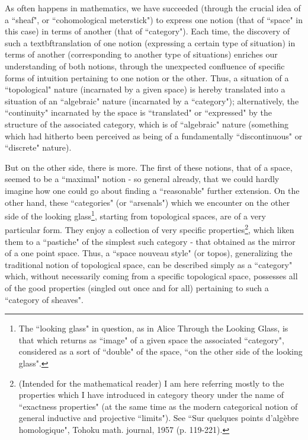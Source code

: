 As often happens in mathematics, we have succeeded (through the crucial idea of a ``sheaf", or ``cohomological meterstick") to express one notion (that of ``space" in this case) in terms of another (that of ``category"). Each time, the discovery of such a textbf{translation} of one notion (expressing a certain type of situation) in terms of another (corresponding to another type of situations) enriches our understanding of both notions, through the unexpected confluence of specific forms of intuition pertaining to one notion or the other. Thus, a situation of a ``topological" nature (incarnated by a given space) is hereby translated into a situation of an ``algebraic" nature (incarnated by a ``category"); alternatively, the ``continuity" incarnated by the space is ``translated" or ``expressed" by the structure of the associated category, which is of ``algebraic" nature (something which had hitherto been perceived as being of a fundamentally ``discontinuous" or ``discrete" nature).

But on the other side, there is more. The first of these notions, that of a space, seemed to be a ``maximal" notion - so general already, that we could hardly imagine how one could go about finding a ``reasonable" further extension. On the other hand, these ``categories" (or ``arsenals") which we encounter on the other side of the looking glass\footnote{The ``looking glass" in question, as in Alice Through the Looking Glass, is that which returns as ``image" of a given space the associated ``category", considered as a sort of ``double" of the space, ``on the other side of the looking glass".}, starting from topological spaces, are of a very particular form. They enjoy a collection of very specific properties\footnote{(Intended for the mathematical reader) I am here referring mostly to the properties which I have introduced in category theory under the name of ``exactness properties" (at the same time as the modern categorical notion of general inductive and projective ``limits"). See ``Sur quelques points d'alg\`ebre homologique", Tohoku math. journal, 1957 (p. 119-221).}, which liken them to a ``pastiche" of the simplest such category - that obtained as the mirror of a one point space. Thus, a ``space nouveau style" (or topos), generalizing the traditional notion of topological space, can be described simply as a ``category" which, without necessarily coming from a specific topological space, possesses all of the good properties (singled out once and for all) pertaining to such a ``category of sheaves". 
\begin{center} {\fontsize{14}{14}\selectfont {}} \end{center}

